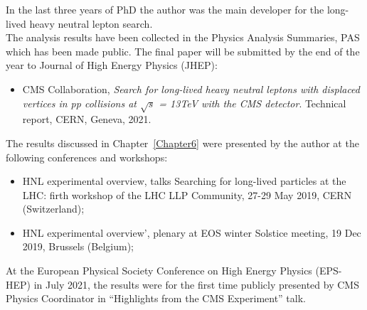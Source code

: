In the last three years of PhD the author was the main developer for the
long-lived heavy neutral lepton search. \\
The analysis results have been collected in the Physics Analysis
Summaries, PAS which has been made public. The final paper will be
submitted by the end of the year to Journal
of High Energy Physics (JHEP):
\begin{itemize}
\setlength\itemsep{-0.1em}
\item CMS Collaboration, \emph{Search for long-lived heavy neutral leptons with displaced vertices in pp collisions at $\sqrt{s}$ =
13TeV with the CMS detector}. Technical report, CERN, Geneva, 2021.
\end{itemize}

The results discussed in Chapter~\ref{Chapter6} were presented by the author at the following
conferences and workshops:

\begin{itemize}
\setlength\itemsep{-0.1em}
\item HNL experimental overview, talks Searching for long-lived
  particles at the LHC: firth workshop of the LHC LLP Community, 27-29
  May 2019, CERN (Switzerland);
\item HNL experimental overview', plenary at EOS winter Solstice
  meeting, 19 Dec 2019, Brussels (Belgium);
\end{itemize}

At the European Physical Society Conference on High Energy Physics
(EPS-HEP) in July 2021, the results were for the first time publicly
presented by CMS Physics Coordinator in ``Highlights from the CMS
Experiment'' talk.

